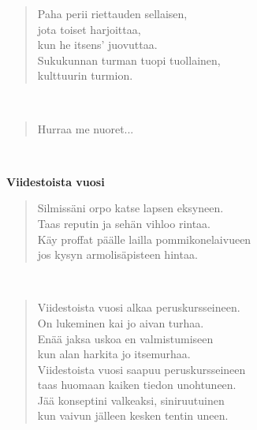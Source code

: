 \noindent\begin{minipage}{\linewidth}
\begin{verse}
	Paha perii riettauden sellaisen,\\
	jota toiset harjoittaa,\\
	kun he itsens' juovuttaa.\\
	Sukukunnan turman tuopi tuollainen,\\
	kulttuurin turmion.\\
\end{verse}
\end{minipage}\\[10pt]
\noindent\begin{minipage}{\linewidth}
\begin{verse}
	Hurraa me nuoret...\\
\end{verse}
\end{minipage}\\[10pt]
%
%
\noindent\begin{minipage}{\linewidth}
\vspace{5pt}
\parbox[t]{0.85\linewidth}{\raggedright {\large\bf Viidestoista vuosi}\\[6pt]}
\begin{verse}
	Silmissäni orpo katse lapsen eksyneen.\\
	Taas reputin ja sehän vihloo rintaa.\\
	Käy proffat päälle lailla pommikonelaivueen\\
	jos kysyn armolisäpisteen hintaa.\\
\end{verse}
\end{minipage}\\[10pt]
\noindent\begin{minipage}{\linewidth}
\begin{verse}
	Viidestoista vuosi alkaa peruskursseineen.\\
	On lukeminen kai jo aivan turhaa.\\
	Enää jaksa uskoa en valmistumiseen\\
	kun alan harkita jo itsemurhaa.\\
	Viidestoista vuosi saapuu peruskursseineen\\
	taas huomaan kaiken tiedon unohtuneen.\\
	Jää konseptini valkeaksi, siniruutuinen\\
	kun vaivun jälleen kesken tentin uneen.\\
\end{verse}
\end{minipage}\\[10pt]
